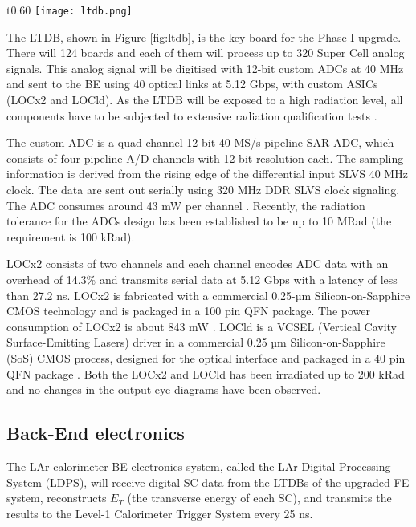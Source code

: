 \documentclass{llncs}
\begin{document}
\begin{wrapfigure}{t}{0.60\textwidth}
\vspace{-25pt}
  \centering
    \texttt{[image: ltdb.png]}
  \caption{LTDB board under test.}
  \label{fig:ltdb}
 \vspace{-40pt}
\end{wrapfigure}

The LTDB, shown in Figure \ref{fig:ltdb}, is the key board for the Phase-I upgrade. There will 124 boards and each of them will process up to 320 Super Cell analog signals. This analog signal will be digitised with 12-bit custom ADCs at 40 MHz and sent to the BE using 40 optical links at 5.12 Gbps, with custom ASICs (LOCx2 and LOCld). As the LTDB will be exposed to a high radiation level, all components have to be subjected to extensive radiation qualification tests \cite{Buchanan:1151347}.

The custom ADC is a quad-channel 12-bit 40 MS/s pipeline SAR ADC, which consists of four pipeline A/D channels with 12-bit resolution each. The sampling information is derived from the rising edge of the differential input SLVS 40 MHz clock. The data are sent out serially using 320 MHz DDR SLVS clock signaling. The ADC consumes around 43 mW per channel \cite{Xu:2229579}. Recently, the radiation tolerance for the ADCs design has been established to be up to 10 MRad (the requirement is 100 kRad).

LOCx2 consists of two channels and each channel encodes ADC data with an overhead of 14.3$\%$ and transmits serial data at 5.12 Gbps with a latency of less than 27.2 ns. LOCx2 is fabricated with a commercial 0.25-µm Silicon-on-Sapphire CMOS technology and is packaged in a 100 pin QFN package. The power consumption of LOCx2 is about 843 mW \cite{1748-0221-11-02-C02013}.
LOCld is a VCSEL (Vertical Cavity Surface-Emitting Lasers) driver in a commercial 0.25 µm Silicon-on-Sapphire (SoS) CMOS process, designed for the optical interface and packaged in a 40 pin QFN package \cite{1748-0221-8-01-C01031}. 
Both the LOCx2 and LOCld has been irradiated up to 200 kRad and no changes in the output eye diagrams have been observed.

\subsection{Back-End electronics}
The LAr calorimeter BE electronics system, called the LAr Digital Processing System (LDPS), will receive digital SC data from the LTDBs of the upgraded FE system, reconstructs $E_{T}$ (the transverse energy of each SC), and transmits the results to the Level-1 Calorimeter Trigger System every 25 ns. 
\end{document}
